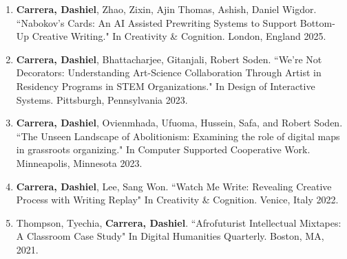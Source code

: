 \begin{enumerate}
  \item \textbf{Carrera, Dashiel}, Zhao, Zixin, Ajin Thomas, Ashish, Daniel Wigdor. ``Nabokov's Cards: An AI Assisted Prewriting Systems to Support Bottom-Up Creative Writing." In Creativity \& Cognition. London, England 2025. \\
  \item \textbf{Carrera, Dashiel}, Bhattacharjee, Gitanjali, Robert Soden. ``We're Not Decorators: Understanding Art-Science Collaboration Through Artist in Residency Programs in STEM Organizations." In Design of Interactive Systems. Pittsburgh, Pennsylvania 2023. \\
  \item \textbf{Carrera, Dashiel}, Ovienmhada, Ufuoma, Hussein, Safa, and Robert Soden. ``The Unseen Landscape of Abolitionism: Examining the role of digital maps in
grassroots organizing."  In Computer Supported Cooperative Work. Minneapolis, Minnesota 2023.\\
  \item \textbf{Carrera, Dashiel}, Lee, Sang Won. ``Watch Me Write: Revealing Creative Process with Writing Replay" In Creativity \& Cognition. Venice, Italy 2022. \\
  \item Thompson, Tyechia, \textbf{Carrera, Dashiel}. ``Afrofuturist Intellectual Mixtapes: A Classroom Case Study" In Digital Humanities Quarterly. Boston, MA, 2021.\
 \end{enumerate}

